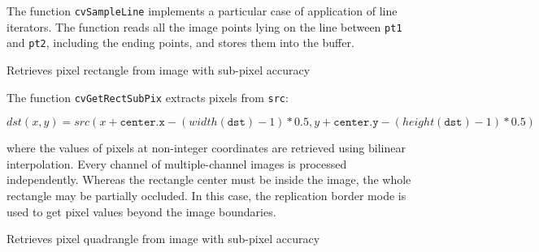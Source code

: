 \begin{description}
\end{description}

The function \texttt{cvSampleLine} implements a particular case of application of line iterators. The function reads all the image points lying on the line between \texttt{pt1} and \texttt{pt2}, including the ending points, and stores them into the buffer.

\label{GetRectSubPix}

Retrieves pixel rectangle from image with sub-pixel accuracy


\begin{description}
\end{description}

The function \texttt{cvGetRectSubPix} extracts pixels from \texttt{src}:

\[
dst(x, y) = src(x + \texttt{center.x} - (width(\texttt{dst})-1)*0.5, y + \texttt{center.y} - (height(\texttt{dst} )-1)*0.5)
\]

where the values of pixels at non-integer coordinates are retrieved
using bilinear interpolation. Every channel of multiple-channel
images is processed independently. Whereas the rectangle center
must be inside the image, the whole rectangle may be partially
occluded. In this case, the replication border mode is used to get
pixel values beyond the image boundaries.

\label{GetQuadrangleSubPix}

Retrieves pixel quadrangle from image with sub-pixel accuracy

